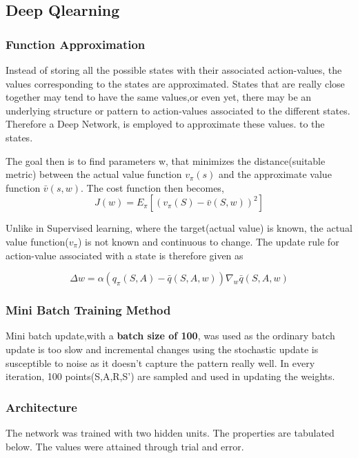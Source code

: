 \documentclass[12pt]{article}
\begin{document}
\subsection{Deep Qlearning}
\subsubsection{Function Approximation}
Instead of storing all the possible states with their associated action-values, the values corresponding to the states are approximated. 
States that are really close together may tend to have the same values,or even yet, there may be an underlying structure or pattern to 
action-values associated to the different states. Therefore a Deep Network, is employed to approximate these values. 
to the states.

The goal then is to find parameters w, that minimizes the distance(suitable metric) between the actual value function $v_\pi(s)$ and 
the approximate value function $\bar{v}(s,w)$.
The cost function then becomes,
\begin{equation}
    J(w) =  E_\pi[(v_\pi(S) - \bar{v}(S,w))^2]
\end{equation}

Unlike in Supervised learning, 
where the target(actual value)  is known, the actual value function($v_\pi$) is not known and continuous to 
change.  The update rule for action-value associated with a state is therefore given as

\begin{equation}
  \Delta w = \alpha(q_\pi(S,A)-\bar{q}(S,A,w))\nabla_{w}\bar{q}(S,A,w)
\end{equation}

\subsubsection{Mini Batch Training Method}
Mini batch update,with a \textbf{batch size of 100},  was used as the ordinary batch update is too slow and incremental changes using
the stochastic update is susceptible to noise as it doesn't capture the pattern really well. In every iteration, 100 points(S,A,R,S') are 
sampled and used in updating the weights.


\subsubsection{Architecture} 
The network was trained with two hidden units. The properties are tabulated below. The values were attained through trial and error.
\end{document}
